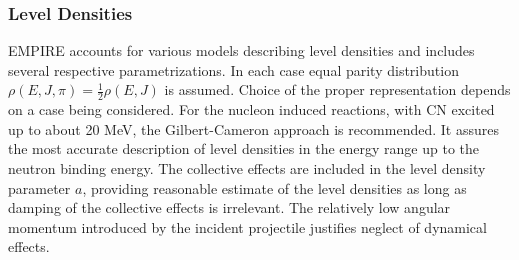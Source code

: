 \documentclass[twocolumn,amsmath,amssymb,10pt,groupedaddress,a4paper]{revtex4}
\begin{document}
%
%
%


\subsubsection{Level Densities}
EMPIRE accounts for various models describing level densities
and includes several respective parametrizations. In each case equal
parity distribution $\rho(E,J,\pi)=\frac{1}{2}\rho(E,J)$ is assumed.
Choice of the proper representation depends on a case being considered.
For the nucleon induced reactions, with CN excited up to about 20
MeV, the Gilbert-Cameron approach is recommended. It assures the most
accurate description of level densities in the energy range up to
the neutron binding energy. The collective effects are included in
the level density parameter $a$, providing reasonable estimate of
the level densities as long as damping of the collective effects is
irrelevant. The relatively low angular momentum introduced by the
incident projectile justifies neglect of dynamical effects.
\end{document}
